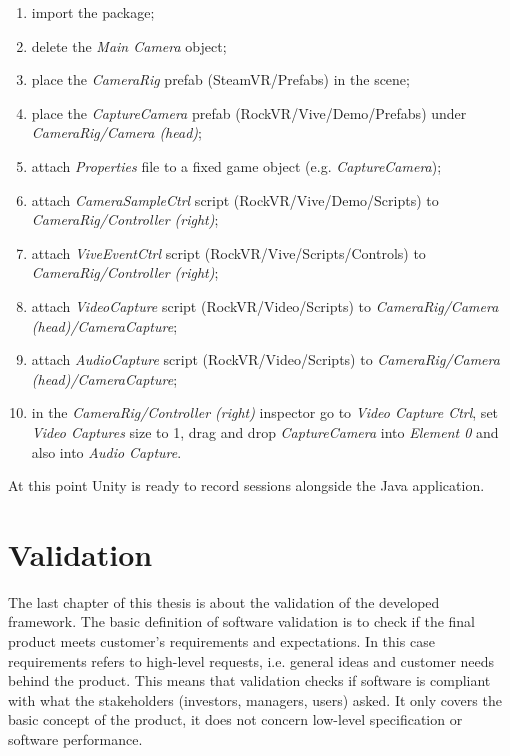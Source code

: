 \documentclass[binding=0.6cm,LaM]{sapthesis}
\begin{document}
\begin{enumerate}

\item import the package;

\item delete the \textit{Main Camera} object;

\item place the \textit{CameraRig} prefab (SteamVR/Prefabs) in the scene; 

\item place the \textit{CaptureCamera} prefab (RockVR/Vive/Demo/Prefabs) under \textit{CameraRig/Camera (head)}; 

\item attach \textit{Properties} file to a fixed game object (e.g. \textit{CaptureCamera});

\item attach \textit{CameraSampleCtrl} script (RockVR/Vive/Demo/Scripts) to \textit{CameraRig/Controller (right)}; 

\item attach \textit{Vive\textunderscore EventCtrl} script (RockVR/Vive/Scripts/Controls) to \textit{CameraRig/Controller (right)};

\item attach \textit{VideoCapture} script (RockVR/Video/Scripts) to \textit{CameraRig/Camera (head)/CameraCapture};

\item attach \textit{AudioCapture} script (RockVR/Video/Scripts) to \textit{CameraRig/Camera (head)/CameraCapture};

\item in the \textit{CameraRig/Controller (right)} inspector go to \textit{Video Capture Ctrl}, set \textit{Video Captures} size to 1, drag and drop \textit{CaptureCamera} into \textit{Element 0} and also into \textit{Audio Capture}.

\end{enumerate}

At this point Unity is ready to record sessions alongside the Java application.


\chapter{Validation}
The last chapter of this thesis is about the validation of the developed framework. The basic definition of software validation is to check if the final product meets customer's requirements and expectations. In this case requirements refers to high-level requests, i.e. general ideas and customer needs behind the product. This means that validation checks if software is compliant with what the stakeholders (investors, managers, users) asked. It only covers the basic concept of the product, it does not concern low-level specification or software performance.
\end{document}
